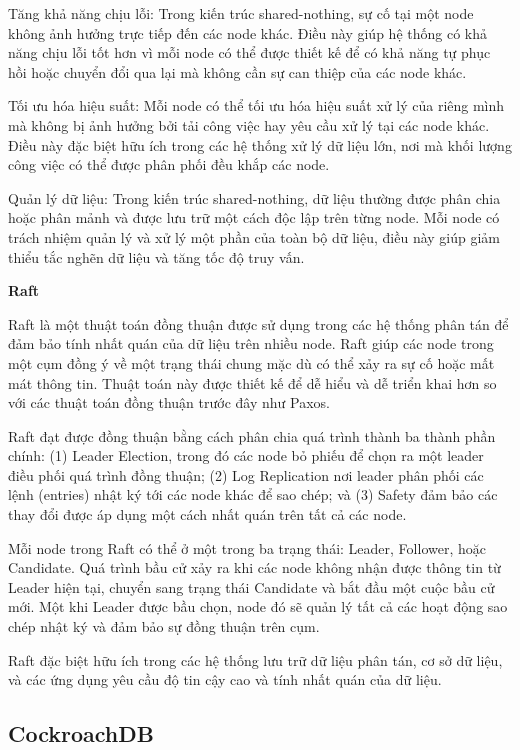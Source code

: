 \documentclass[14pt]{article}
\begin{document}
Tăng khả năng chịu lỗi: Trong kiến trúc shared-nothing, sự cố tại một node không ảnh hưởng trực tiếp đến các node khác. Điều này giúp hệ thống có khả năng chịu lỗi tốt hơn vì mỗi node có thể được thiết kế để có khả năng tự phục hồi hoặc chuyển đổi qua lại mà không cần sự can thiệp của các node khác.

Tối ưu hóa hiệu suất: Mỗi node có thể tối ưu hóa hiệu suất xử lý của riêng mình mà không bị ảnh hưởng bởi tải công việc hay yêu cầu xử lý tại các node khác. Điều này đặc biệt hữu ích trong các hệ thống xử lý dữ liệu lớn, nơi mà khối lượng công việc có thể được phân phối đều khắp các node.

Quản lý dữ liệu: Trong kiến trúc shared-nothing, dữ liệu thường được phân chia hoặc phân mảnh và được lưu trữ một cách độc lập trên từng node. Mỗi node có trách nhiệm quản lý và xử lý một phần của toàn bộ dữ liệu, điều này giúp giảm thiểu tắc nghẽn dữ liệu và tăng tốc độ truy vấn.

\textbf{Raft}

Raft là một thuật toán đồng thuận được sử dụng trong các hệ thống phân tán để đảm bảo tính nhất quán của dữ liệu trên nhiều node. Raft giúp các node trong một cụm đồng ý về một trạng thái chung mặc dù có thể xảy ra sự cố hoặc mất mát thông tin. Thuật toán này được thiết kế để dễ hiểu và dễ triển khai hơn so với các thuật toán đồng thuận trước đây như Paxos.

Raft đạt được đồng thuận bằng cách phân chia quá trình thành ba thành phần chính: (1) Leader Election, trong đó các node bỏ phiếu để chọn ra một leader điều phối quá trình đồng thuận; (2) Log Replication nơi leader phân phối các lệnh (entries) nhật ký tới các node khác để sao chép; và (3) Safety đảm bảo các thay đổi được áp dụng một cách nhất quán trên tất cả các node.

Mỗi node trong Raft có thể ở một trong ba trạng thái: Leader, Follower, hoặc Candidate. Quá trình bầu cử xảy ra khi các node không nhận được thông tin từ Leader hiện tại, chuyển sang trạng thái Candidate và bắt đầu một cuộc bầu cử mới. Một khi Leader được bầu chọn, node đó sẽ quản lý tất cả các hoạt động sao chép nhật ký và đảm bảo sự đồng thuận trên cụm.

Raft đặc biệt hữu ích trong các hệ thống lưu trữ dữ liệu phân tán, cơ sở dữ liệu, và các ứng dụng yêu cầu độ tin cậy cao và tính nhất quán của dữ liệu.



\subsection{CockroachDB}
\end{document}
